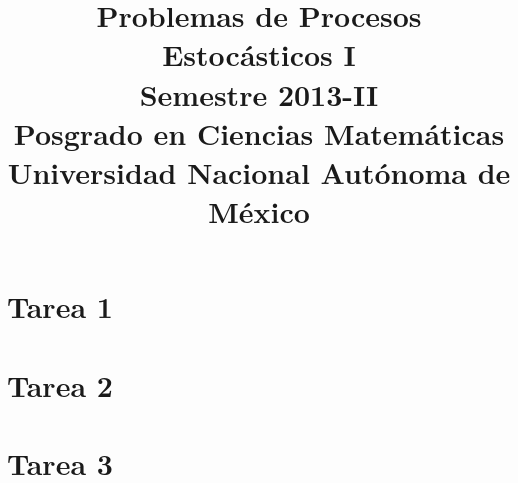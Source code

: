 \documentclass[a5paper,oneside]{amsart}
\title[Problemas de Procesos I]{
	Problemas de Procesos Estocásticos I\\ Semestre 2013-II\\ Posgrado en Ciencias Matemáticas\\ Universidad Nacional Autónoma de México
}
\theoremstyle{dotless}
\begin{document}
	\maketitle
	\part{Tarea 1}
		
		
		\nqed
		
	\part{Tarea 2}
		
		
		\nqed
		
	\part{Tarea 3}
		
		
		\nqed
		
	
	
\end{document}
